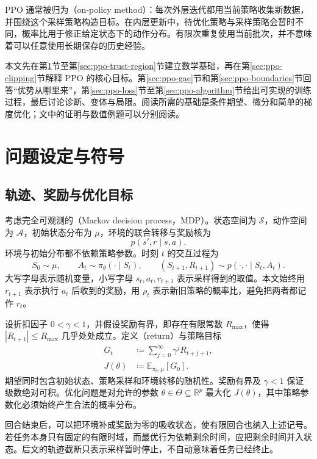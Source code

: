 \documentclass[UTF8]{ctexart}
\begin{document}
PPO 通常被归为（on-policy method）：每次外层迭代都用当前策略收集新数据，并围绕这个采样策略构造目标。在内层更新中，待优化策略与采样策略会暂时不同，概率比用于修正给定状态下的动作分布。有限次重复使用当前批次，并不意味着可以任意使用长期保存的历史经验。

本文先在第\ref{sec:ppo-mdp}节至第\ref{sec:ppo-trust-region}节建立数学基础，再在第\ref{sec:ppo-clipping}节解释 PPO 的核心目标。第\ref{sec:ppo-gae}节和第\ref{sec:ppo-boundaries}节回答“优势从哪里来”，第\ref{sec:ppo-loss}节至第\ref{sec:ppo-algorithm}节给出可实现的训练过程，最后讨论诊断、变体与局限。阅读所需的基础是条件期望、微分和简单的梯度优化；文中的证明与数值例题可以分别阅读。

\section{问题设定与符号}
\label{sec:ppo-mdp}

\subsection{轨迹、奖励与优化目标}

考虑完全可观测的（Markov decision process，MDP）。状态空间为 $\mathcal S$，动作空间为 $\mathcal A$，初始状态分布为 $\mu$，环境的联合转移与奖励核为
\[
  p(s',r\mid s,a).
\]
环境与初始分布都不依赖策略参数。时刻 $t$ 的交互过程为
\[
  S_0\sim\mu,\qquad
  A_t\sim\pi_\theta(\cdot\mid S_t),\qquad
  (S_{t+1},R_{t+1})\sim p(\cdot,\cdot\mid S_t,A_t).
\]
大写字母表示随机变量，小写字母 $s_t,a_t,r_{t+1}$ 表示采样得到的取值。本文始终用 $r_{t+1}$ 表示执行 $a_t$ 后收到的奖励，用 $\rho_t$ 表示新旧策略的概率比，避免把两者都记作 $r_t$。

设折扣因子 $0<\gamma<1$，并假设奖励有界，即存在有限常数 $R_{\max}$，使得 $|R_{t+1}|\le R_{\max}$ 几乎处处成立。定义（return）与策略目标
\begin{align}
  G_t &\coloneqq \sum_{j=0}^{\infty}\gamma^jR_{t+j+1},
  \label{eq:ppo-return}\\
  J(\theta)&\coloneqq
  \mathbb E_{\pi_\theta,\mu}[G_0].
  \label{eq:ppo-performance}
\end{align}
期望同时包含初始状态、策略采样和环境转移的随机性。奖励有界及 $\gamma<1$ 保证级数绝对可积。优化问题是对允许的参数 $\theta\in\Theta\subseteq\mathbb R^p$ 最大化 $J(\theta)$，其中策略参数化必须始终产生合法的概率分布。

回合结束后，可以把环境补成奖励为零的吸收状态，使有限回合也纳入上述记号。若任务本身只有固定的有限时域，而最优行为依赖剩余时间，应把剩余时间并入状态。后文的轨迹截断只表示采样暂时停止，不自动意味着任务已经终止。
\end{document}
